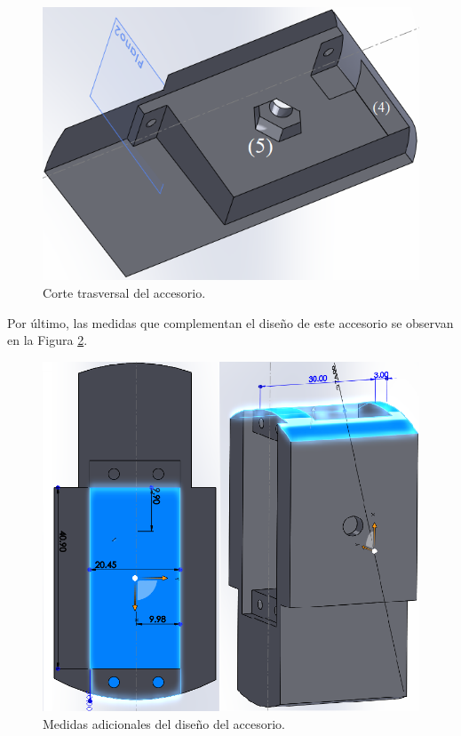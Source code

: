 \begin{figure}[H]
    \begin{center}
    	\includegraphics[scale=0.4]{img/cortetrassuspen.png}
    \end{center}
    \caption{Corte trasversal del accesorio. \label{cortetrassuspenpng}}
\end{figure}

Por último, las medidas que complementan el diseño de este accesorio se observan en la Figura \ref{medidassuspenpng}. 

\begin{figure}[H]
    \begin{center}
    	\includegraphics[scale=0.4]{img/otrasmedidassuspensor.png}
    \end{center}
    \caption{Medidas adicionales del diseño del accesorio. \label{medidassuspenpng}}
\end{figure}

